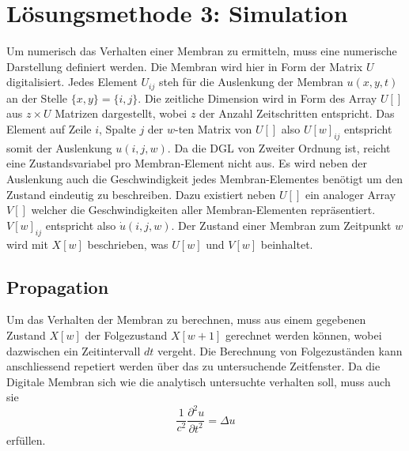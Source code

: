 %
%
%
\section{Lösungsmethode 3: Simulation 
	\label{kreismembran:section:teil4}}

Um numerisch das Verhalten einer Membran zu ermitteln, muss eine numerische Darstellung definiert werden.
Die Membran wird hier in Form der Matrix $  U $ digitalisiert.
Jedes Element  $ U_{ij} $ steh für die Auslenkung der Membran $ u(x,y,t) $ an der Stelle $ \{x,y\}=\{i,j\} $.
Die zeitliche Dimension wird in Form des Array $  U[] $ aus $ z \times U $ Matrizen dargestellt, wobei $ z $ der Anzahl Zeitschritten entspricht.
Das Element auf Zeile $ i $, Spalte $ j $ der $ w $-ten Matrix von $ U[] $ also $ U[w]_{ij} $ entspricht somit der Auslenkung $ u(i,j,w) $.
Da die DGL von Zweiter Ordnung ist, reicht eine Zustandsvariabel pro Membran-Element nicht aus. 
Es wird neben der Auslenkung auch die Geschwindigkeit jedes Membran-Elementes benötigt um den Zustand eindeutig zu beschreiben. 
Dazu existiert neben $ U[] $ ein analoger Array $ V[] $ welcher die Geschwindigkeiten aller Membran-Elementen repräsentiert. 
$ V[w]_{ij} $ entspricht also $ \dot{u}(i,j,w) $. 
Der Zustand einer Membran zum Zeitpunkt $ w $ wird mit $ X[w] $ beschrieben, was $ U[w] $ und $ V[w] $ beinhaltet.

\subsection{Propagation}
Um das Verhalten der Membran zu berechnen, muss aus einem gegebenen Zustand $ X[w] $ der Folgezustand $ X[w+1] $ gerechnet werden können, wobei dazwischen ein Zeitintervall $ dt $ vergeht. 
Die Berechnung von Folgezuständen kann anschliessend repetiert werden über das zu untersuchende Zeitfenster.
Da die Digitale Membran sich wie die analytisch untersuchte verhalten soll, muss auch sie
\begin{equation*}
	\frac{1}{c^2}\frac{\partial^2u}{\partial t^2} = \Delta u
\end{equation*}
erfüllen.
